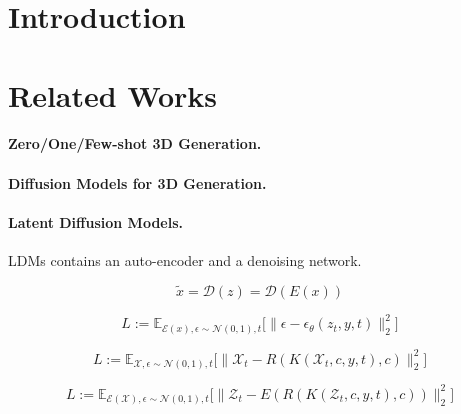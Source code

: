 \documentclass{article}
\theoremstyle{plain}
\theoremstyle{definition}
\theoremstyle{remark}
\begin{document}
\printAffiliationsAndNotice{\icmlEqualContribution} %

\begin{abstract}

\end{abstract}

\section{Introduction}

\section{Related Works}

\paragraph{Zero/One/Few-shot 3D Generation.}

\paragraph{Diffusion Models for 3D Generation.}

\paragraph{Latent Diffusion Models.} 
%
LDMs contains an auto-encoder and a denoising network.
%


\begin{equation}
\tilde{x}=\mathcal{D}(z)=\mathcal{D}(E(x))
\label{eq.1}
\end{equation}



\begin{equation}
L:=\mathbb{E}_{
\mathcal{E}(x),\epsilon\sim\mathcal{N}(0,1),t}
\Big[\|\epsilon-\epsilon_\theta(z_t,y,t)\|_2^2\Big]
\label{eq.2}
\end{equation}

\begin{equation}
L:=\mathbb{E}_{
\mathcal{X},\epsilon\sim\mathcal{N}(0,1),t}
\Big[\|\mathcal{X}_t - 
R(K(\mathcal{X}_t,c,y,t), c)\|_2^2\Big]
\label{eq.2}
\end{equation}


\begin{equation}
L:=\mathbb{E}_{
\mathcal{E}(\mathcal{X}),\epsilon\sim\mathcal{N}(0,1),t}
\Big[\|\mathcal{Z}_t - 
E(R(K(\mathcal{Z}_t,c,y,t), c))\|_2^2\Big]
\label{eq.2}
\end{equation}
\end{document}
